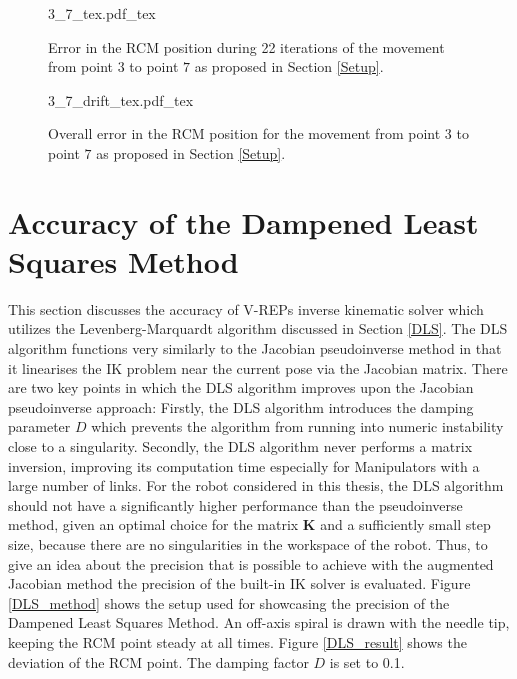  \begin{figure}[t!]
	\begin{center}
		{3_7_tex.pdf_tex}
		\caption{ Error in the RCM position during 22 iterations of the movement  from point $3$ to point $7$ as proposed in Section \ref{Setup}.}
		\label{3_7}
	\end{center}
\end{figure}

\begin{figure}[t!]
	\begin{center}
		{3_7_drift_tex.pdf_tex}
		\caption{ Overall error in the RCM position for the movement from point $3$ to point $7$ as proposed in Section \ref{Setup}. }
		\label{3_7_drift}
	\end{center}
\end{figure}

\section{Accuracy of the Dampened Least Squares Method} \label{Acc_DLS}

This section discusses the accuracy of V-REPs inverse kinematic solver which utilizes the Levenberg-Marquardt algorithm discussed in Section \ref{DLS}. The DLS algorithm functions very similarly to the Jacobian pseudoinverse method in that it linearises the IK problem near the current pose via the Jacobian matrix. There are two key points in which the DLS algorithm improves upon the Jacobian pseudoinverse approach: Firstly, the DLS algorithm introduces the damping parameter $D$ which prevents the algorithm from running into numeric instability close to a singularity. Secondly, the DLS algorithm never performs a matrix inversion, improving its computation time especially for Manipulators with a large number of links.
For the robot considered in this thesis, the DLS algorithm should not have a significantly higher performance than the pseudoinverse method, given an optimal choice for the matrix $\bm{K}$ and a sufficiently small step size, because there are no singularities in the workspace of the robot. Thus, to give an idea about the precision that is possible to achieve with the augmented Jacobian method the precision of the built-in IK solver is evaluated. Figure \ref{DLS_method} shows the setup used for showcasing the precision of the Dampened Least Squares Method. An off-axis spiral is drawn with the needle tip, keeping the RCM point steady at all times. Figure \ref{DLS_result} shows the deviation of the RCM point. The damping factor $D$ is set to 0.1.  

